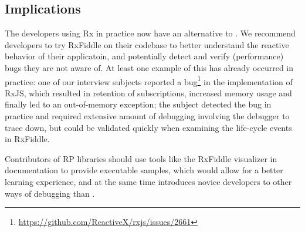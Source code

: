 \subsection{Implications}
The developers using Rx in practice now have an alternative to \printfdebugging{}. 
We recommend developers to try RxFiddle on their codebase to better understand the reactive behavior of their applicatoin, 
and potentially detect and verify (performance) bugs they are not aware of.
At least one example of this has already occurred in practice:
one of our interview subjects reported a bug\footnote{\url{https://github.com/ReactiveX/rxjs/issues/2661}} in the  implementation of RxJS,
which resulted in retention of subscriptions, increased memory usage and finally led to an out-of-memory exception;
the subject detected the bug in practice and required extensive amount of debugging involving the \NodeJS{} debugger to trace down,
but could be validated quickly when examining the life-cycle events in RxFiddle.

Contributors of RP libraries should use tools like the RxFiddle visualizer in documentation to provide executable samples,
which would allow for a better learning experience, 
and at the same time introduces novice developers to other ways of debugging than \printfdebugging{}.
